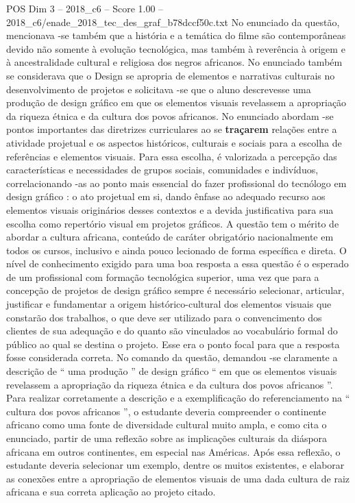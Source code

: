 \begin{textsample}{POS Dim 3 – 2018\_c6 – Score 1.00 – 2018\_c6/enade\_2018\_tec\_des\_graf\_b78dccf50c.txt}
No enunciado da questão, mencionava -se também que a história e a temática do filme são contemporâneas devido não somente à evolução tecnológica, mas também à reverência à origem e à ancestralidade cultural e religiosa dos negros africanos.
No enunciado também se considerava que o Design se apropria de elementos e narrativas culturais no desenvolvimento de projetos e solicitava -se que o aluno descrevesse uma produção de design gráfico em que os elementos visuais revelassem a apropriação da riqueza étnica e da cultura dos povos africanos.
No enunciado abordam -se pontos importantes das diretrizes curriculares ao se \textbf{traçarem} relações entre a atividade projetual e os aspectos históricos, culturais e sociais para a escolha de referências e elementos visuais.
Para essa escolha, é valorizada a percepção das características e necessidades de grupos sociais, comunidades e indivíduos, correlacionando -as ao ponto mais essencial do fazer profissional do tecnólogo em design gráfico : o ato projetual em si, dando ênfase ao adequado recurso aos elementos visuais originários desses contextos e a devida justificativa para sua escolha como repertório visual em projetos gráficos.
A questão tem o mérito de abordar a cultura africana, conteúdo de caráter obrigatório nacionalmente em todos os cursos, inclusivo e ainda pouco lecionado de forma específica e direta.
O nível de conhecimento exigido para uma boa resposta a essa questão é o esperado de um profissional com formação tecnológica superior, uma vez que para a concepção de projetos de design gráfico sempre é necessário selecionar, articular, justificar e fundamentar a origem histórico-cultural dos elementos visuais que constarão dos trabalhos, o que deve ser utilizado para o convencimento dos clientes de sua adequação e do quanto são vinculados ao vocabulário formal do público ao qual se destina o projeto.
Esse era o ponto focal para que a resposta fosse considerada correta.
No comando da questão, demandou -se claramente a descrição de “ uma produção ” de design gráfico “ em que os elementos visuais revelassem a apropriação da riqueza étnica e da cultura dos povos africanos ”.
Para realizar corretamente a descrição e a exemplificação do referenciamento na “ cultura dos povos africanos ”, o estudante deveria compreender o continente africano como uma fonte de diversidade cultural muito ampla, e como cita o enunciado, partir de uma reflexão sobre as implicações culturais da diáspora africana em outros continentes, em especial nas Américas.
Após essa reflexão, o estudante deveria selecionar um exemplo, dentre os muitos existentes, e elaborar as conexões entre a apropriação de elementos visuais de uma dada cultura de raiz africana e sua correta aplicação ao projeto citado.

\end{textsample}
